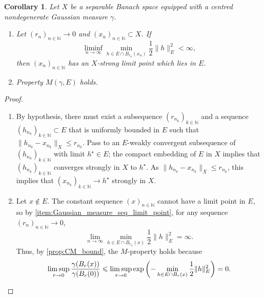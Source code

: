 \documentclass[11pt]{article}
\newcommand*{\cball}[2]{B_{#2}(#1)}
\newcommand*{\Naturals}{\mathbb{N}}
\renewcommand*{\leq}{\leqslant}
\newcommand*{\crcdfm}[3]{#1(\cball{#2}{#3})}
\theoremstyle{plain}
\newtheorem{corollary}[theorem]{Corollary}
\theoremstyle{definition}
\newcommand{\norm}[1]{\lVert #1 \rVert}
\numberwithin{equation}{section}
\numberwithin{figure}{section}
\numberwithin{table}{section}
\begin{document}
\begin{corollary}
	\label{cor:Gaussian_measure_M-prop}
	Let $X$ be a separable Banach space equipped with a centred nondegenerate Gaussian measure $\gamma$.
	\begin{enumerate}[label=(\alph*)]
		\item
		\label{item:Gaussian_measure_seq_limit_point}
		Let $(r_n)_{n \in \Naturals} \to 0$ and $(x_{n})_{n \in \Naturals} \subset X$.
		If
		\begin{equation*}
			\liminf_{n \to \infty} \min_{h \in E \cap \cball{x_{n}}{r_n}} \frac{1}{2}\norm{h}_{E}^{2} < \infty,
		\end{equation*}
		then $(x_{n})_{n \in \Naturals}$ has an $X$-strong limit point which lies in $E$.

		\item
		\label{item:Gaussian_measure_M-prop}
		Property $M(\gamma, E)$ holds.
	\end{enumerate}
\end{corollary}

\begin{proof}
	\begin{enumerate}[label=(\alph*)]
		\item
		By hypothesis, there must exist a subsequence $(r_{n_k})_{k \in \Naturals}$ and a sequence $(h_{n_k})_{k \in \Naturals} \subset E$ that is uniformly bounded in $E$ such that $\norm{h_{n_k} - x_{n_k}}_X \leq r_{n_k}$.
		Pass to an $E$-weakly convergent subsequence of $(h_{n_k})_{k \in \Naturals}$ with limit $h^{\star} \in E$;
		the compact embedding of $E$ in $X$ implies that $(h_{n_k})_{k \in \Naturals}$ converges strongly in $X$ to $h^\star$.
		As $\norm{h_{n_k} - x_{n_k}}_X \leq r_{n_k}$, this implies that $(x_{n_k})_{k \in \Naturals} \to h^{\star}$ strongly in $X$.

		\item
		Let $x \notin E$.
		The constant sequence $(x)_{n \in \Naturals}$ cannot have a limit point in $E$, so by \ref{item:Gaussian_measure_seq_limit_point}, for any sequence $(r_n)_{n \in \Naturals} \to 0$,
		\begin{equation*}
			\lim_{n \to \infty} \min_{h \in E \cap \cball{x}{r_n}} \frac{1}{2}\|h\|_{E}^{2} = \infty.
		\end{equation*}
		Thus, by \cref{prop:CM_bound}, the $M$-property holds because
		\begin{equation*}
			\limsup_{r \to 0} \frac{\crcdfm{\gamma}{x}{r}}{\crcdfm{\gamma}{0}{r}} \leq \limsup_{r \to 0} \exp\left( -\min_{h \in E \cap \cball{x}{r}} \frac{1}{2} \norm{h}_{E}^{2} \right) = 0.
			\qedhere
		\end{equation*}
	\end{enumerate}
\end{proof}
\end{document}
